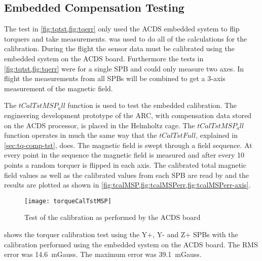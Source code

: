 \subsection{Embedded Compensation Testing}

The test in \cref{fig:tqtst,fig:tqerr} only used the \ac{ACDS} embedded system to flip torquers and take measurements. \matlab was used to do all of the calculations for the calibration. During the flight the sensor data must be calibrated using the embedded system on the \ac{ACDS} board. Furthermore the tests in \cref{fig:tqtst,fig:tqerr} were for a single \ac{SPB} and could only measure two axes. In flight the measurements from all \acp{SPB} will be combined to get a 3-axis measurement of the magnetic field.

The \lstMat$tCalTstMSP_all$ function is used to test the embedded calibration. The engineering development prototype of the \ac{ARC}, with compensation data stored on the \ac{ACDS} processor, is placed in the Helmholtz cage. The \lstMat$tCalTstMSP_all$ function operates in much the same way that the \lstMat$tCalTstFull$, explained in \cref{sec:tq-comp-tst}, does. The magnetic field is swept through a field sequence. At every point in the sequence the magnetic field is measured and after every 10 points a random torquer is flipped in each axis. The calibrated total magnetic field values as well as the calibrated values from each \ac{SPB} are read by \matlab and the results are plotted as shown in \cref{fig:tcalMSP,fig:tcalMSPerr,fig:tcalMSPerr-axis}.

\begin{figure}[!ht]
    \centering
    \texttt{[image: torqueCalTstMSP]}
    \caption{Test of the calibration as performed by the \ac{ACDS} board}
    \label{fig:tcalMSP}
\end{figure}

 shows the torquer calibration test using the Y+, Y- and Z+ \acp{SPB} with the calibration performed using the embedded system on the \ac{ACDS} board. The RMS error was 14.6~mGauss. The maximum error was 39.1~mGauss.


